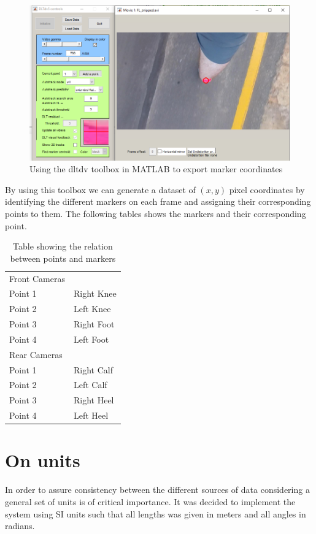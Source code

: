 \begin{figure}[!ht] 
\captionsetup{width=1\linewidth, font=small}  
\includegraphics[width=1\linewidth]{figures/toolbox.png}
\caption{Using the dltdv toolbox in MATLAB to export marker coordinates}
\label{fig:toolbox}
\end{figure}

By using this toolbox we can generate a dataset of $ (x,y) $ pixel coordinates by identifying the different markers on each frame and assigning their corresponding points to them. The following tables shows the markers and their corresponding point.

\begin{table}[!ht]
\centering
\caption{Table showing the relation between points and markers}
\label{my-label}
\begin{tabular}{ll}
Front Cameras &            \\
Point 1       & Right Knee \\
Point 2       & Left Knee  \\
Point 3       & Right Foot \\
Point 4       & Left Foot  \\
Rear Cameras  &            \\
Point 1       & Right Calf \\
Point 2       & Left Calf  \\
Point 3       & Right Heel \\
Point 4       & Left Heel 
\end{tabular}
\end{table} 


\section{On units}
In order to assure consistency between the different sources of data considering a general set of units is of critical importance. It was decided to implement the system using SI units such that all lengths was given in meters and all angles in radians.

